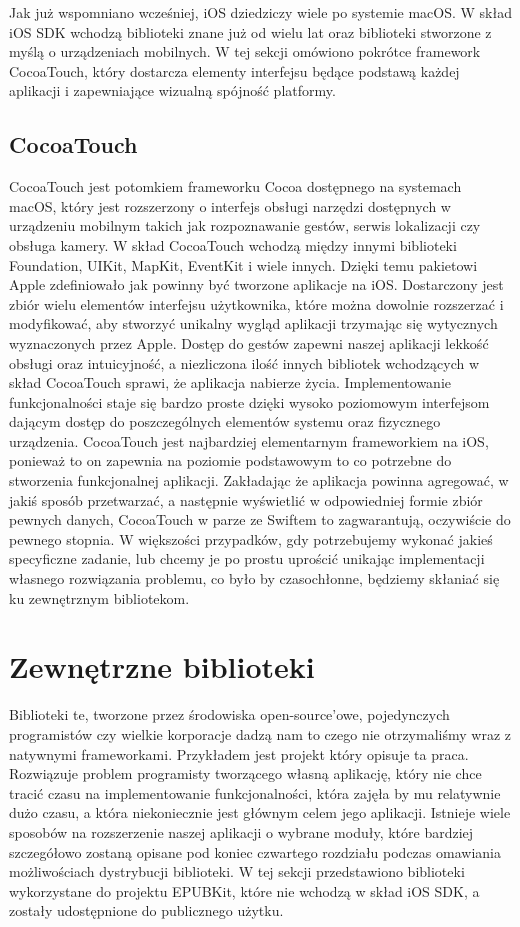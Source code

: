 Jak już wspomniano wcześniej, iOS dziedziczy wiele po systemie macOS. W skład iOS SDK wchodzą biblioteki znane już od wielu lat oraz biblioteki stworzone z myślą o urządzeniach mobilnych. W tej sekcji omówiono pokrótce framework CocoaTouch, który dostarcza elementy interfejsu będące podstawą każdej aplikacji i zapewniające wizualną spójność platformy.

\subsection{CocoaTouch}

CocoaTouch jest potomkiem frameworku Cocoa dostępnego na systemach macOS, który jest rozszerzony o interfejs obsługi narzędzi dostępnych w urządzeniu mobilnym takich jak rozpoznawanie gestów, serwis lokalizacji czy obsługa kamery. W skład CocoaTouch wchodzą między innymi biblioteki Foundation, UIKit, MapKit, EventKit i wiele innych. Dzięki temu pakietowi Apple zdefiniowało jak powinny być tworzone aplikacje na iOS. Dostarczony jest zbiór wielu elementów interfejsu użytkownika, które można dowolnie rozszerzać i modyfikować, aby stworzyć unikalny wygląd aplikacji trzymając się wytycznych wyznaczonych przez Apple. Dostęp do gestów zapewni naszej aplikacji lekkość obsługi oraz intuicyjność, a niezliczona ilość innych bibliotek wchodzących w skład CocoaTouch sprawi, że aplikacja nabierze życia. Implementowanie funkcjonalności staje się bardzo proste dzięki wysoko poziomowym interfejsom dającym dostęp do poszczególnych elementów systemu oraz fizycznego urządzenia. CocoaTouch jest najbardziej elementarnym frameworkiem na iOS, ponieważ to on zapewnia na poziomie podstawowym to co potrzebne do stworzenia funkcjonalnej aplikacji. Zakładając że aplikacja powinna agregować, w jakiś sposób przetwarzać, a następnie wyświetlić w odpowiedniej formie zbiór pewnych danych, CocoaTouch w parze ze Swiftem to zagwarantują, oczywiście do pewnego stopnia. W większości przypadków, gdy potrzebujemy wykonać jakieś specyficzne zadanie, lub chcemy je po prostu uprościć unikając implementacji własnego rozwiązania problemu, co było by czasochłonne, będziemy skłaniać się ku zewnętrznym bibliotekom.

\section{Zewnętrzne biblioteki}

Biblioteki te, tworzone przez środowiska open-source’owe, pojedynczych programistów czy wielkie korporacje dadzą nam to czego nie otrzymaliśmy wraz z natywnymi frameworkami. Przykładem jest projekt który opisuje ta praca. Rozwiązuje problem programisty tworzącego własną aplikację, który nie chce tracić czasu na implementowanie funkcjonalności, która zajęła by mu relatywnie dużo czasu, a która niekoniecznie jest głównym celem jego aplikacji. Istnieje wiele sposobów na rozszerzenie naszej aplikacji o wybrane moduły, które bardziej szczegółowo zostaną opisane pod koniec czwartego rozdziału podczas omawiania możliwościach dystrybucji biblioteki. W tej sekcji przedstawiono biblioteki wykorzystane do projektu EPUBKit, które nie wchodzą w skład iOS SDK, a zostały udostępnione do publicznego użytku.

